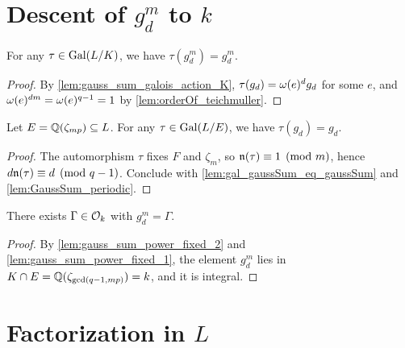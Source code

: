 \section{Descent of $g_d^m$ to $k$}

\begin{lemma}
  \label{lem:gauss_sum_power_fixed_2}
  \leanok
  For any $\tau \in \mathrm{Gal}(L/K)$, we have $\tau(g_d^m) = g_d^m$.
\end{lemma}

\begin{proof}
  \leanok
  By \ref{lem:gauss_sum_galois_action_K}, $\tau(g_d) = \omega(e)^d g_d$ for some $e$, and
  $\omega(e)^{dm} = \omega(e)^{q-1} = 1$ by \ref{lem:orderOf_teichmuller}.
\end{proof}

\begin{lemma}
  \label{lem:gauss_sum_power_fixed_1}
  \leanok
  Let $E = \mathbb{Q}(\zeta_{mp}) \subseteq L$. For any $\tau \in \mathrm{Gal}(L/E)$, we have
  $\tau(g_d) = g_d$.
\end{lemma}

\begin{proof}
  \leanok
  The automorphism $\tau$ fixes $F$ and $\zeta_m$, so $\mathfrak{n}(\tau) \equiv 1 \pmod{m}$, hence
  $d \mathfrak{n}(\tau) \equiv d \pmod{q-1}$. Conclude with \ref{lem:gal_gaussSum_eq_gaussSum} and
  \ref{lem:GaussSum_periodic}.
\end{proof}

\begin{lemma}
  \label{lem:gauss_sum_power_in_cyclotomic}
  \leanok
  There exists $\Gamma \in \mathcal{O}_k$ with $g_d^m = \Gamma$.
\end{lemma}

\begin{proof}
  \leanok
  By \ref{lem:gauss_sum_power_fixed_2} and \ref{lem:gauss_sum_power_fixed_1}, the element
  $g_d^m$ lies in $K \cap E = \mathbb{Q}(\zeta_{\gcd(q-1, mp)}) = k$, and it is integral.
\end{proof}

\section{Factorization in $L$}

